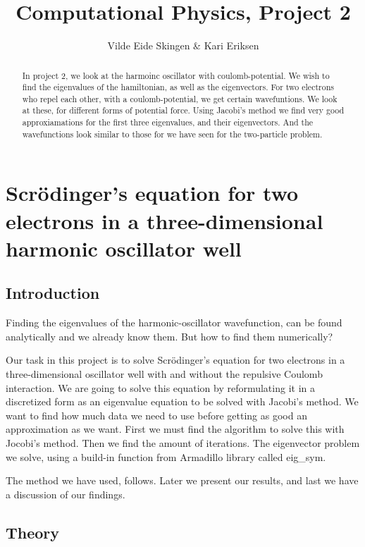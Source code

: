 \documentclass[a4paper,12pt, english]{article}
\title{Computational Physics, Project 2}
\author{Vilde Eide Skingen & Kari Eriksen}
\begin{document}
\maketitle
\titlepage{}

\begin{abstract}
In project 2, we look at the harmoinc oscillator with coulomb-potential. We wish to find the eigenvalues of the hamiltonian, as well as the eigenvectors. For two electrons who repel each other, with a coulomb-potential, we get certain wavefuntions. We look at these, for different forms of potential force. Using Jacobi's method we find very good approxiamations for the first three eigenvalues, and their eigenvectors. And the wavefunctions look similar to those for we have seen for the two-particle problem.

\end{abstract}


\section{Scr\"odinger's equation for two electrons in a three-dimensional harmonic oscillator well }

\subsection{Introduction}

Finding the eigenvalues of the harmonic-oscillator wavefunction, can be found analytically and we already know them. But how to find them numerically?

Our task in this project is to solve Scr\"odinger's equation for two electrons in a three-dimensional oscillator well with and without the repulsive Coulomb interaction. We are going to solve this equation by reformulating it in a discretized form as an eigenvalue equation to be solved with Jacobi's method. We want to find how much data we need to use before getting as good an approximation as we want. First we must find the algorithm to solve this with Jocobi's method. Then we find the amount of iterations. 
The eigenvector problem we solve, using a build-in function from Armadillo library called eig\_sym. 

The method we have used, follows. Later we present our results, and last we have a discussion of our findings.

\subsection{Theory}
\end{document}
